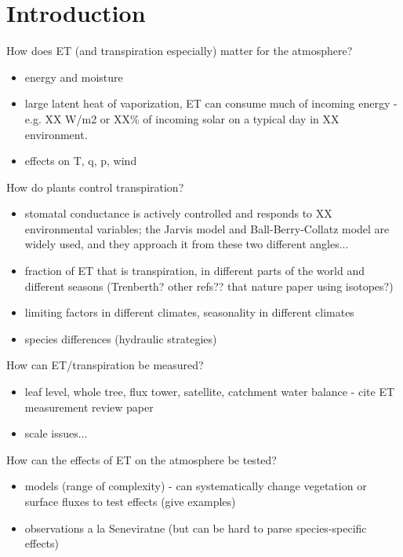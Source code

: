 \chapter{Introduction}
\label{c.intro}

\linespread{1.6}\selectfont

How does ET (and transpiration especially) matter for the atmosphere?
\begin{itemize}
\item energy and moisture
\item large latent heat of vaporization, ET can consume much of incoming energy - e.g. XX W/m2 or XX\% of incoming solar on a typical day in XX environment.
\item effects on T, q, p, wind
\end{itemize}

How do plants control transpiration?
\begin{itemize}
\item stomatal conductance is actively controlled and responds to XX environmental variables; the Jarvis model and Ball-Berry-Collatz model are widely used, and they approach it from these two different angles...
\item fraction of ET that is transpiration, in different parts of the world and different seasons (Trenberth?  other refs?? that nature paper using isotopes?)
\item limiting factors in different climates, seasonality in different climates
\item species differences (hydraulic strategies)
\end{itemize}

How can ET/transpiration be measured?
\begin{itemize}
\item leaf level, whole tree, flux tower, satellite, catchment water balance - cite ET measurement review paper
\item scale issues...
\end{itemize}

How can the effects of ET on the atmosphere be tested?
\begin{itemize}
\item models (range of complexity) - can systematically change vegetation or surface fluxes to test effects (give examples)
\item observations a la Seneviratne (but can be hard to parse species-specific effects)
\end{itemize}

